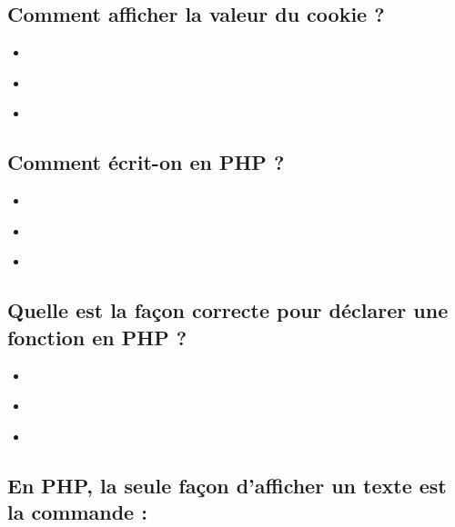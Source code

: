 \documentclass[11pt,a4paper]{article}
\begin{document}
\subsection{Comment afficher la valeur du cookie  ?}

\begin{itemize}
\item[\CaseCoche]  \\
\item[\CaseCoche]  \\
\item[\CaseCoche]  \\
\end{itemize}


\subsection{Comment écrit-on  en PHP ?}

\begin{itemize}
\item[\CaseCoche]  \\
\item[\CaseCoche]  \\
\item[\CaseCoche]  \\
\end{itemize}


\subsection{Quelle est la façon correcte pour déclarer une fonction  en PHP ?}

\begin{itemize}
\item[\CaseCoche]  \\
\item[\CaseCoche]  \\
\item[\CaseCoche]  \\
\end{itemize}


\subsection{En PHP, la seule façon d'afficher un texte est la commande  :}
\end{document}
